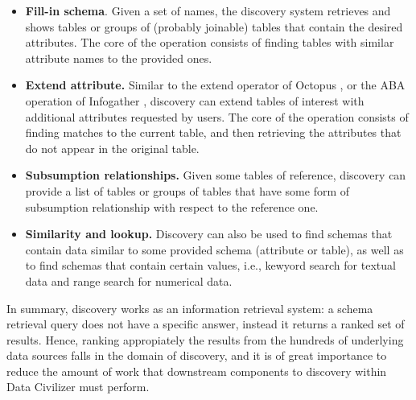 \begin{itemize}
\item \textbf{Fill-in schema}. Given a set of names, the discovery system
retrieves and shows tables or groups of (probably joinable) tables that contain
the desired attributes. The core of the operation consists of finding tables
with similar attribute names to the provided ones.
\item \textbf{Extend attribute.} Similar to the extend operator of Octopus
\cite{octopus}, or the ABA operation of Infogather \cite{DBLP:conf/sigmod/YakoutGCC12}, discovery
can extend tables of interest with additional attributes requested by users. The
core of the operation consists of finding matches to the current table, and then
retrieving the attributes that do not appear in the original table.
\item \textbf{Subsumption relationships.} Given some tables of reference,
discovery can provide a list of tables or groups of tables that have some form
of subsumption relationship with respect to the reference one. 
\item \textbf{Similarity and lookup.} Discovery can also be used to find schemas
that contain data similar to some provided schema (attribute or table), as well
as to find schemas that contain certain values, i.e., kewyord search for
textual data and range search for numerical data.
\end{itemize}

In summary, discovery works as an information retrieval system: a schema retrieval query
does not have a specific answer, instead it returns a ranked set of results.
Hence, ranking appropiately the results from the hundreds of underlying data
sources falls in the domain of discovery, and it is of great importance to reduce
the amount of work that downstream components to discovery within Data Civilizer
must perform.

